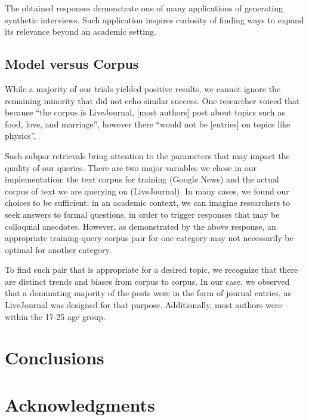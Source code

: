 \documentclass{sigchi}
\begin{document}
The obtained responses demonstrate one of many applications of generating synthetic interviews. Such application inspires curiosity of finding ways to expand its relevance beyond an academic setting. 

\subsection{Model versus Corpus}
While a majority of our trials yielded positive results, we cannot ignore the remaining minority that did not echo similar success. One researcher voiced that because ``the corpus is LiveJournal, [most authors] post about topics such as food, love, and marriage'', however there ``would not be [entries] on topics like physics''. 

Such subpar retrievals bring attention to the parameters that may impact the quality of our queries. There are two major variables we chose in our implementation: the text corpus for training (Google News) and the actual corpus of text we are querying on (LiveJournal). In many cases, we found our choices to be sufficient; in an academic context, we can imagine researchers to seek answers to formal questions, in order to trigger responses that may be colloquial anecdotes. However, as demonstrated by the above response, an appropriate training-query corpus pair for one category may not necessarily be optimal for another category.

To find such pair that is appropriate for a desired topic, we recognize that there are distinct trends and biases from corpus to corpus. In our case, we observed that a dominating majority of the posts were in the form of journal entries, as LiveJournal was designed for that purpose. Additionally, most authors were within the 17-25 age group.


\section{Conclusions}


\section{Acknowledgments}




\end{document}
